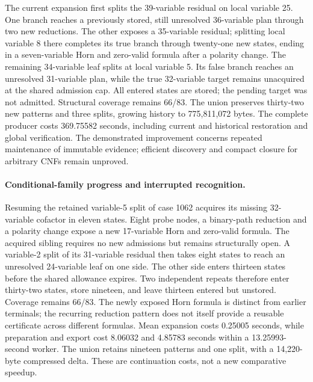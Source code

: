 \documentclass[11pt,a4paper]{article}
\numberwithin{equation}{section}
\theoremstyle{plain}
\theoremstyle{definition}
\theoremstyle{remark}
\begin{document}
The current expansion first splits the 39-variable residual on local variable 25. One branch reaches a previously stored, still unresolved 36-variable plan through two new reductions. The other exposes a 35-variable residual; splitting local variable 8 there completes its true branch through twenty-one new states, ending in a seven-variable Horn and zero-valid formula after a polarity change. The remaining 34-variable leaf splits at local variable 5. Its false branch reaches an unresolved 31-variable plan, while the true 32-variable target remains unacquired at the shared admission cap. All entered states are stored; the pending target was not admitted. Structural coverage remains 66/83. The union preserves thirty-two new patterns and three splits, growing history to 775,811,072 bytes. The complete producer costs 369.75582 seconds, including current and historical restoration and global verification. The demonstrated improvement concerns repeated maintenance of immutable evidence; efficient discovery and compact closure for arbitrary CNFs remain unproved.

\paragraph{Conditional-family progress and interrupted recognition.}
Resuming the retained variable-5 split of case 1062 acquires its missing 32-variable cofactor in eleven states. Eight probe nodes, a binary-path reduction and a polarity change expose a new 17-variable Horn and zero-valid formula. The acquired sibling requires no new admissions but remains structurally open. A variable-2 split of its 31-variable residual then takes eight states to reach an unresolved 24-variable leaf on one side. The other side enters thirteen states before the shared allowance expires. Two independent repeats therefore enter thirty-two states, store nineteen, and leave thirteen entered but unstored. Coverage remains 66/83. The newly exposed Horn formula is distinct from earlier terminals; the recurring reduction pattern does not itself provide a reusable certificate across different formulas. Mean expansion costs 0.25005 seconds, while preparation and export cost 8.06032 and 4.85783 seconds within a 13.25993-second worker. The union retains nineteen patterns and one split, with a 14,220-byte compressed delta. These are continuation costs, not a new comparative speedup.
\end{document}
